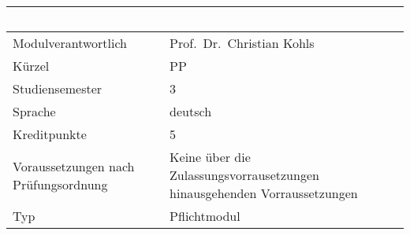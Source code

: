 \begin{longtable}[]{@{}ll@{}}
\toprule
\begin{minipage}[b]{0.12\columnwidth}\raggedright\strut
~\strut
\end{minipage} & \begin{minipage}[b]{0.12\columnwidth}\raggedright\strut
~\strut
\end{minipage}\tabularnewline
\midrule
\endhead
\begin{minipage}[t]{0.12\columnwidth}\raggedright\strut
Modulverantwortlich\strut
\end{minipage} & \begin{minipage}[t]{0.12\columnwidth}\raggedright\strut
Prof.~Dr.~Christian Kohls\strut
\end{minipage}\tabularnewline
\begin{minipage}[t]{0.12\columnwidth}\raggedright\strut
Kürzel\strut
\end{minipage} & \begin{minipage}[t]{0.12\columnwidth}\raggedright\strut
PP\strut
\end{minipage}\tabularnewline
\begin{minipage}[t]{0.12\columnwidth}\raggedright\strut
Studiensemester\strut
\end{minipage} & \begin{minipage}[t]{0.12\columnwidth}\raggedright\strut
3\strut
\end{minipage}\tabularnewline
\begin{minipage}[t]{0.12\columnwidth}\raggedright\strut
Sprache\strut
\end{minipage} & \begin{minipage}[t]{0.12\columnwidth}\raggedright\strut
deutsch\strut
\end{minipage}\tabularnewline
\begin{minipage}[t]{0.12\columnwidth}\raggedright\strut
Kreditpunkte\strut
\end{minipage} & \begin{minipage}[t]{0.12\columnwidth}\raggedright\strut
5\strut
\end{minipage}\tabularnewline
\begin{minipage}[t]{0.12\columnwidth}\raggedright\strut
Voraussetzungen nach Prüfungsordnung\strut
\end{minipage} & \begin{minipage}[t]{0.12\columnwidth}\raggedright\strut
Keine über die Zulassungsvorrausetzungen hinausgehenden
Vorraussetzungen\strut
\end{minipage}\tabularnewline
\begin{minipage}[t]{0.12\columnwidth}\raggedright\strut
Typ\strut
\end{minipage} & \begin{minipage}[t]{0.12\columnwidth}\raggedright\strut
Pflichtmodul\strut
\end{minipage}\tabularnewline
\bottomrule
\end{longtable}

